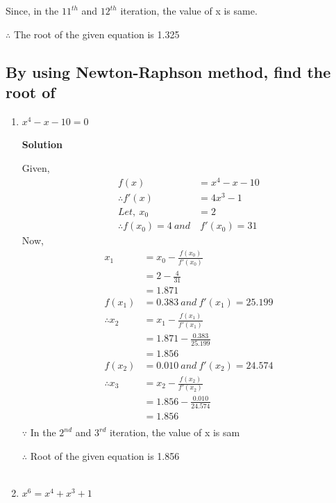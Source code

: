 \documentclass[11pt, a4paper, oneside]{book}
\begin{document}
\begin{enumerate}
                  Since, in the $11^{th}$ and $12^{th}$ iteration, the value of x is same.

                  $\therefore$ The root of the given equation is 1.325
            \end{enumerate}

            \subsection{By using Newton-Raphson method, find the root of }
              \begin{enumerate}
                \item $x^4-x-10=0$

                  \textbf{Solution}

                  Given,
                  \begin{align*}
                    f(x)&=x^4-x-10\\
                    \therefore f'(x)&=4x^3-1\\
                    Let,\ x_0&=2\\
                    \therefore f(x_0)=4\ and&\ f'(x_0)=31
                  \end{align*}
                  Now,
                  \begin{align*}
                    x_1&=x_0-\frac{f(x_0)}{f'(x_0)}\\
                    &=2-\frac{4}{31}\\
                    &=1.871\\
                    f(x_1)&=0.383\ and\ f'(x_1)=25.199\\
                    \therefore x_2&=x_1-\frac{f(x_1)}{f'(x_1)}\\
                    &=1.871-\frac{0.383}{25.199}\\
                    &=1.856\\
                    f(x_2)&=0.010\ and\ f'(x_2)=24.574\\
                    \therefore x_3&=x_2-\frac{f(x_2)}{f'(x_2)}\\
                    &=1.856-\frac{0.010}{24.574}\\
                    &=1.856\\
                  \end{align*}
                  $\because$ In the $2^{nd}$ and $3^{rd}$ iteration, the value of x is sam

                  $\therefore$ Root of the given equation is 1.856\\
                  \ \\
                \item $x^6=x^4+x^3+1$


\end{enumerate}
\end{document}
